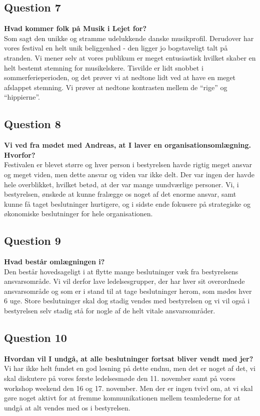 \subsection{Question 7}
\label{i2q7}
\noindent \textbf{Hvad kommer folk på Musik i Lejet for?} \\
Som sagt den unikke og stramme udelukkende danske musikprofil. Derudover har vores festival en helt unik beliggenhed - den ligger jo bogstaveligt talt på stranden. Vi mener selv at vores publikum er meget entusiastisk hvilket skaber en helt bestemt stemning for musikelskere. Tisvilde er lidt snobbet i sommerferieperioden, og det prøver vi at nedtone lidt ved at have en meget afslappet stemning. Vi prøver at nedtone kontrasten mellem de “rige” og “hippierne”.

\subsection{Question 8}
\label{i2q8}
\noindent \textbf{Vi ved fra mødet med Andreas, at I laver en organisationsomlægning. Hvorfor?} \\
Festivalen er blevet større og hver person i bestyrelsen havde rigtig meget ansvar og meget viden, men dette ansvar og viden var ikke delt. Der var ingen der havde hele overblikket, hvilket betød, at der var mange uundværlige personer. Vi, i bestyrelsen, ønskede at kunne fralægge os noget af det enorme ansvar, samt kunne få taget beslutninger hurtigere, og i sidste ende fokusere på strategiske og økonomiske beslutninger for hele organisationen. 

\subsection{Question 9}
\label{i2q9}
\noindent \textbf{Hvad består omlægningen i?} \\
Den består hovedsageligt i at flytte mange beslutninger væk fra bestyrelsens ansvarsområde. Vi vil derfor lave ledelsesgrupper, der har hver sit overordnede ansvarsområde og som er i stand til at tage beslutninger herom, som mødes hver 6 uge. Store beslutninger skal dog stadig vendes med bestyrelsen og vi vil også i bestyrelsen selv stadig stå for nogle af de helt vitale ansvarsområder. 

\subsection{Question 10}
\label{i2q10}
\noindent \textbf{Hvordan vil I undgå, at alle beslutninger fortsat bliver vendt med jer?} \\
Vi har ikke helt fundet en god løsning på dette endnu, men det er noget af det, vi skal diskutere på vores første ledelsesmøde den 11. november samt på vores workshop weekend den 16 og 17. november. Men der er ingen tvivl om, at vi skal gøre noget aktivt for at fremme kommunikationen mellem teamlederne for at undgå at alt vendes med os i bestyrelsen.

